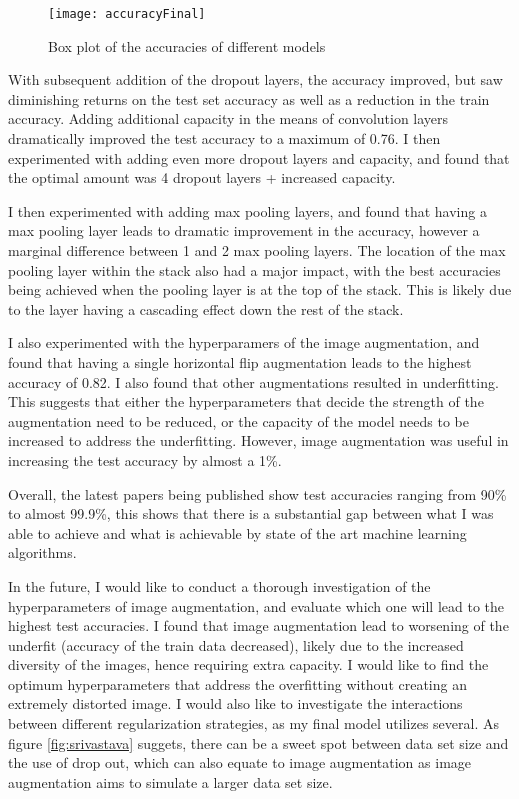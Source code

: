 \documentclass{article}
\begin{document}
\begin{figure}[!htb]
    \begin{center}
        \texttt{[image: accuracyFinal]}
        \caption{Box plot of the accuracies of different models}
    \end{center}
\end{figure}

With subsequent addition of the dropout layers, the accuracy improved, but saw diminishing returns on the test set accuracy as well as a reduction in the train accuracy. Adding additional capacity in the means of convolution layers dramatically improved the test accuracy to a maximum of 0.76. I then experimented with adding even more dropout layers and capacity, and found that the optimal amount was 4 dropout layers + increased capacity. 

I then experimented with adding max pooling layers, and found that having a max pooling layer leads to dramatic improvement in the accuracy, however a marginal difference between 1 and 2 max pooling layers. The location of the max pooling layer within the stack also had a major impact, with the best accuracies being achieved when the pooling layer is at the top of the stack. This is likely due to the layer having a cascading effect down the rest of the stack.

I also experimented with the hyperparamers of the image augmentation, and found that having a single horizontal flip augmentation leads to the highest accuracy of 0.82. I also found that other augmentations resulted in underfitting. This suggests that either the hyperparameters that decide the strength of the augmentation need to be reduced, or the capacity of the model needs to be increased to address the underfitting. However, image augmentation was useful in increasing the test accuracy by almost a 1\%.

Overall, the latest papers being published show test accuracies ranging from 90\% to almost 99.9\%\autocite{papers}, this shows that there is a substantial gap between what I was able to achieve and what is achievable by state of the art machine learning algorithms.

In the future, I would like to conduct a thorough investigation of the hyperparameters of image augmentation, and evaluate which one will lead to the highest test accuracies. I found that image augmentation lead to worsening of the underfit (accuracy of the train data decreased), likely due to the increased diversity of the images, hence requiring extra capacity. I would like to find the optimum hyperparameters that address the overfitting without creating an extremely distorted image. I would also like to investigate the interactions between different regularization strategies, as my final model utilizes several. As figure \ref{fig:srivastava} suggets, there can be a sweet spot between data set size and the use of drop out, which can also equate to image augmentation as image augmentation aims to simulate a larger data set size.
\end{document}
